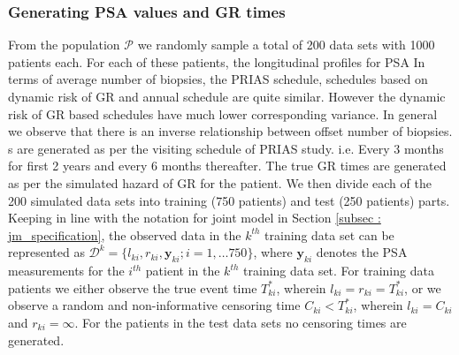 \subsubsection{Generating PSA values and GR times}
From the population $\mathcal{P}$ we randomly sample a total of 200 data sets with 1000 patients each. For each of these patients, the longitudinal profiles for PSA In terms of average number of biopsies, the PRIAS schedule, schedules based on dynamic risk of GR and annual schedule are quite similar. However the dynamic risk of GR based schedules have much lower corresponding variance. In general we observe that there is an inverse relationship between offset number of biopsies.\\
s are generated as per the visiting schedule of PRIAS study. i.e. Every 3 months for first 2 years and every 6 months thereafter. The true GR times are generated as per the simulated hazard of GR for the patient. We then divide each of the 200 simulated data sets into training (750 patients) and test (250 patients) parts. Keeping in line with the notation for joint model in Section \ref{subsec : jm_specification}, the observed data in the $k^{th}$ training data set can be represented as $\mathcal{D}^k = \{l_{ki}, r_{ki}, \boldsymbol{y}_{ki}; i = 1,\ldots 750\}$, where $\boldsymbol{y}_{ki}$ denotes the PSA measurements for the $i^{th}$ patient in the $k^{th}$ training data set. For training data patients we either observe the true event time $T^*_{ki}$, wherein $l_{ki} = r_{ki} = T^*_{ki}$, or we observe a random and non-informative censoring time $C_{ki} < T^*_{ki}$, wherein $l_{ki} = C_{ki}$ and $r_{ki} = \infty$. For the patients in the test data sets no censoring times are generated.

